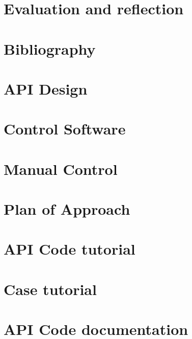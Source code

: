 \documentclass[a4paper,oneside]{book}
\begin{document}
\chapter{Evaluation and reflection}
\chapter{Bibliography}



\appendix
\chapter{API Design}
\chapter{Control Software}
\chapter{Manual Control}
\chapter{Plan of Approach}
\label{app:plan-of-approach}
\chapter{API Code tutorial}
\chapter{Case tutorial}
\chapter{API Code documentation}
\end{document}
